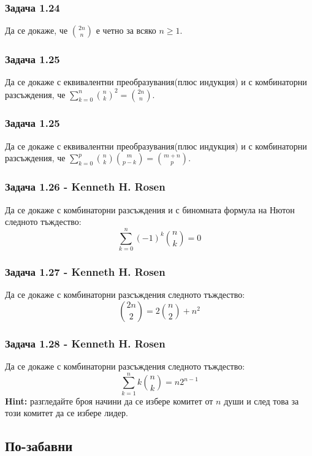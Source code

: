 \documentclass[12pt]{article}
\begin{document}
\subsubsection*{Задача 1.24}
Да се докаже, че $\binom{2n}{n}$ е четно за всяко $n \geq 1$.

\subsubsection*{Задача 1.25}
Да се докаже с еквивалентни преобразувания(плюс индукция) и с комбинаторни разсъждения, че $\displaystyle\sum_{k=0}^n {\binom{n}{k}}^2 = \binom{2n}{n}$.

\subsubsection*{Задача 1.25}
Да се докаже с еквивалентни преобразувания(плюс индукция) и с комбинаторни разсъждения, че $\displaystyle\sum_{k=0}^p \binom{n}{k}\binom{m}{p-k} = \binom{m+n}{p}$.

\subsubsection*{Задача 1.26 - Kenneth H. Rosen}
Да се докаже с комбинаторни разсъждения и с биномната формула на Нютон следното тъждество:
\begin{equation*}
    \displaystyle\sum_{k=0}^{n} {(-1)^k \binom{n}{k}} = 0
\end{equation*}
\subsubsection*{Задача 1.27 - Kenneth H. Rosen}
Да се докаже с комбинаторни разсъждения следното тъждество:
\begin{equation*}
    \binom{2n}{2} = 2 \binom{n}{2} + n^2
\end{equation*}
\subsubsection*{Задача 1.28 - Kenneth H. Rosen}
Да се докаже с комбинаторни разсъждения следното тъждество:
\begin{equation*}
    \displaystyle\sum_{k=1}^{n} {k \binom{n}{k}} = n 2^{n-1}
\end{equation*}
\textbf{Hint: } разгледайте броя начини да се избере комитет от $n$ души и след това за този комитет да се избере лидер.

\subsection*{По-забавни}
\end{document}

